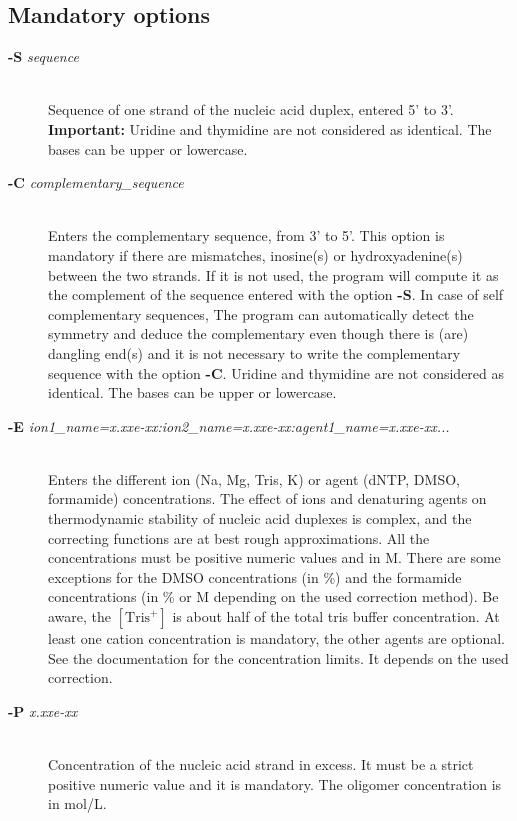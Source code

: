 \documentclass{article}
\begin{document}
\subsection{Mandatory options}
\begin{description}

\item [\textbf{-S} \textit{sequence}  ]\mbox{}\\ 
  Sequence of one strand of the nucleic 
  acid duplex, entered 5' to 3'. \textbf{Important:} 
  Uridine and thymidine are not considered as identical. The bases can be upper or lowercase.
\item [\textbf{-C} \textit{complementary\_sequence}] \mbox{}\\
  Enters the complementary sequence, from 3' to 5'. This option is mandatory if
  there are mismatches, inosine(s) or hydroxyadenine(s) between the two strands. If it is not used, the program
  will compute it as the complement of the sequence entered with the option \textbf{-S}. In case of self complementary sequences,
  The program can automatically detect the symmetry and deduce the complementary even though there is (are) dangling
  end(s) and it is not necessary to write the complementary sequence with the option \textbf{-C}.
  Uridine and thymidine are not considered as identical. The bases can be upper or lowercase.
\item [\textbf{-E} \textit{ion1\_name=x.xxe-xx:ion2\_name=x.xxe-xx:agent1\_name=x.xxe-xx...}] \mbox{}\\
  Enters the different ion (Na, Mg, Tris, K) or agent (dNTP, DMSO, formamide) concentrations. The effect  
  of  ions and denaturing agents on  thermodynamic  stability  of nucleic  acid duplexes is complex,
  and the correcting functions are  at  best rough  approximations. All the concentrations must be positive numeric
  values and in M. There are some exceptions for the DMSO concentrations (in
  \%) and the formamide concentrations
  (in \% or M depending on the used correction method). Be aware, the $[\mbox{Tris}^+]$ is about half of the total tris buffer
  concentration.
  At least one cation concentration is mandatory, the other agents are optional. See the documentation for the concentration 
  limits. It depends on the used correction.
\item [\textbf{-P} \textit{x.xxe-xx}]\mbox{}\\ 
  Concentration of the nucleic acid strand in excess. It must be a strict positive numeric value and it is mandatory. The oligomer
  concentration is in mol/L.

\end{description}
\end{document}
